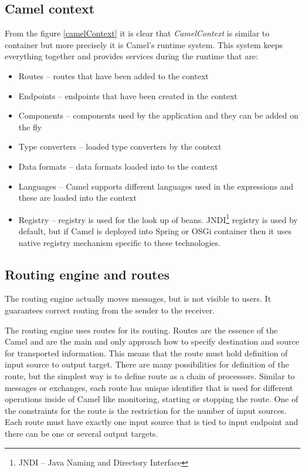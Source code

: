 \documentclass[12pt,final,oneside]{fithesis2}
\begin{document}
\subsection*{Camel context}
From the figure \ref{camelContext} it is clear that \textit{CamelContext} is similar to container but more precisely it is Camel's runtime system. This system keeps everything together and provides services during the runtime that are:
\begin{itemize}
\item
Routes -- routes that have been added to the context

\item
Endpoints -- endpoints that have been created in the context

\item
Components -- components used by the application and they can be added on the fly

\item
Type converters -- loaded type converters by the context

\item
Data formats -- data formats loaded into to the context

\item
Languages -- Camel supports different languages used in the expressions and these are loaded into the context

\item
Registry -- registry is used for the look up of beans. JNDI\footnote{JNDI -- Java Naming and Directory Interface} registry is used by default, but if Camel is deployed into Spring or OSGi container then it uses native registry mechanism specific to these technologies.

\end{itemize}

\subsection*{Routing engine and routes}
The routing engine actually moves messages, but is not visible to users. It guarantees correct routing from the sender to the receiver.

The routing engine uses routes for its routing. Routes are the essence of the Camel and are the main and only approach how to specify destination and source for transported information. This means that the route must hold definition of input source to output target. There are many possibilities for definition of the route, but the simplest way is to define route as a chain of processors\cite{camel-in-action}. Similar to messages or exchanges, each route has unique identifier that is used for different operations inside of Camel like monitoring, starting or stopping the route. One of the constraints for the route is the restriction for the number of input sources. Each route must have exactly one input source that is tied to input endpoint and there can be one or several output targets.
\end{document}
